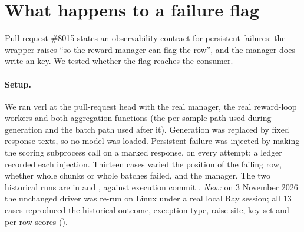 \documentclass[11pt,a4paper]{article}
\newcommand{\pr}[1]{\#{#1}}
\begin{document}
\section{What happens to a failure flag}\label{sec:flag}
Pull request \pr{8015} states an observability contract for persistent failures: the wrapper raises ``so the reward manager can flag the row'', and the  manager does write an  key. We tested whether the flag reaches the consumer.

\paragraph{Setup.} We ran verl at the pull-request head with the real  manager, the real reward-loop workers and both aggregation functions (the per-sample path used during generation and the batch path used after it). Generation was replaced by fixed response texts, so no model was loaded. Persistent failure was injected by making the scoring subprocess call  on a marked response, on every attempt; a ledger recorded each injection. Thirteen cases varied the position of the failing row, whether whole chunks or whole batches failed, and the manager. The two historical runs are in  and , against execution commit . \emph{New:} on 3 November 2026 the unchanged driver was re-run on Linux under a real local Ray session; all 13 cases reproduced the historical outcome, exception type, raise site, key set and per-row scores ().
\end{document}
